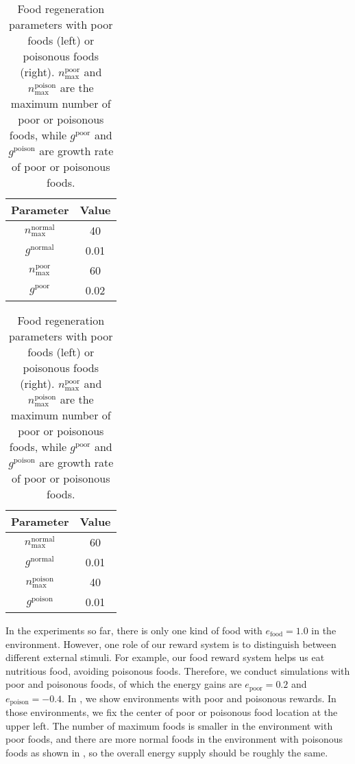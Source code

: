 \begin{table}[t]
  \begin{subtable}[h]{0.45\columnwidth}
    \centering
    \begin{tabular}{cc}
      \toprule
      Parameter & Value \\
      \midrule
      $n_{\textrm{max}}^{\textrm{normal}}$ & 40\\
      $g^{\textrm{normal}}$ & 0.01 \\
      $n_{\textrm{max}}^{\textrm{poor}}$ & 60 \\
      $g^{\textrm{poor}}$ & 0.02 \\
      \bottomrule
    \end{tabular}
  \end{subtable}
  \begin{subtable}[h]{0.45\columnwidth}
    \centering
    \begin{tabular}{cc}
      \toprule
      Parameter & Value \\
      \midrule
      $n_{\textrm{max}}^{\textrm{normal}}$ & 60\\
      $g^{\textrm{normal}}$ & 0.01 \\
      $n_{\textrm{max}}^{\textrm{poison}}$ & 40 \\
      $g^{\textrm{poison}}$ & 0.01 \\
      \bottomrule
    \end{tabular}
  \end{subtable}
  \caption{
    Food regeneration parameters with poor foods (left) or poisonous foods (right).
    $n_{\textrm{max}}^{\textrm{poor}}$ and $n_{\textrm{max}}^{\textrm{poison}}$ are the maximum number of poor or poisonous foods, while $g^{\textrm{poor}}$ and $g^{\textrm{poison}}$ are growth rate of poor or poisonous foods.
  }\label{table:pp}
\end{table}

In the experiments so far, there is only one kind of food with $e_{\mathrm{food}} = 1.0$ in the environment. However, one role of our reward system is to distinguish between different external stimuli. For example, our food reward system helps us eat nutritious food, avoiding poisonous foods. Therefore, we conduct simulations with poor and poisonous foods, of which the energy gains are $e_{\mathrm{poor}} = 0.2$ and $e_{\mathrm{poison}} = -0.4$. In , we show environments with poor and poisonous rewards. In those environments, we fix the center of poor or poisonous food location at the upper left. The number of maximum foods is smaller in the environment with poor foods, and there are more normal foods in the environment with poisonous foods as shown in , so the overall energy supply should be roughly the same.

